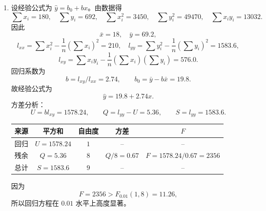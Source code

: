 \documentclass[UTF8,12pt,a4paper]{ctexart}
\begin{document}
\begin{enumerate}[label=\arabic*、]
\item 设经验公式为 $\hat{y}=b_0+bx$。由数据得
\begin{equation*}
\sum x_i=180,\quad \sum y_i=692,\quad \sum x_i^2=3450,\quad
\sum y_i^2=49470,\quad \sum x_iy_i=13032.
\end{equation*}
因此
\begin{equation*}
\bar{x}=18,\quad \bar{y}=69.2,
\end{equation*}
\begin{equation*}
l_{xx}=\sum x_i^2-\frac{1}{n}\left(\sum x_i\right)^2=210,
\quad
l_{yy}=\sum y_i^2-\frac{1}{n}\left(\sum y_i\right)^2=1583.6,
\end{equation*}
\begin{equation*}
l_{xy}=\sum x_iy_i-\frac{1}{n}\left(\sum x_i\right)\left(\sum y_i\right)=576.0.
\end{equation*}
回归系数为
\begin{equation*}
    b=l_{xy}/l_{xx}=2.74,
    \qquad b_0=\bar{y}-b\bar{x}=19.8.
\end{equation*}
故经验公式为
\begin{equation*}
    \hat{y}=19.8+2.74x.
\end{equation*}
方差分析：
\begin{equation*}
    U=bl_{xy}=1578.24,
    \qquad Q=l_{yy}-U=5.36,
    \qquad S=l_{yy}=1583.6.
\end{equation*}
\begin{center}
\begin{tabular}{ccccc}
\toprule
来源 & 平方和 & 自由度 & 方差 & $F$ \\
\midrule
回归 & $U=1578.24$ & $1$ & -- & -- \\
残余 & $Q=5.36$ & $8$ & $Q/8=0.67$ & $F=1578.24/0.67=2356$ \\
总计 & $S=1583.6$ & $9$ & -- & -- \\
\bottomrule
\end{tabular}
\end{center}
因为
\begin{equation*}
    F=2356>F_{0.01}(1,8)=11.26,
\end{equation*}
所以回归方程在 $0.01$ 水平上高度显著。

\end{enumerate}
\end{document}
